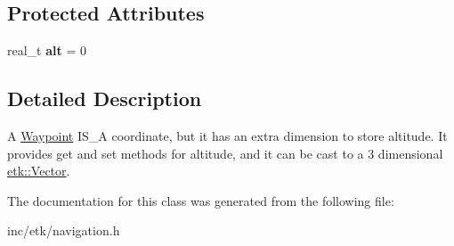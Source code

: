 \subsection*{Protected Attributes}
\begin{DoxyCompactItemize}
\item 
\hypertarget{classetk_1_1_waypoint_a5c301b9ba7c7f8e28f44428b04ea6edc}{real\-\_\-t {\bfseries alt} = 0}\label{classetk_1_1_waypoint_a5c301b9ba7c7f8e28f44428b04ea6edc}

\end{DoxyCompactItemize}


\subsection{Detailed Description}
A \hyperlink{classetk_1_1_waypoint}{Waypoint} I\-S\-\_\-\-A coordinate, but it has an extra dimension to store altitude. It provides get and set methods for altitude, and it can be cast to a 3 dimensional \hyperlink{classetk_1_1_vector}{etk\-::\-Vector}. 

The documentation for this class was generated from the following file\-:\begin{DoxyCompactItemize}
\item 
inc/etk/navigation.\-h\end{DoxyCompactItemize}

